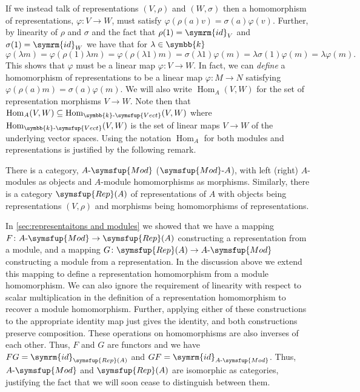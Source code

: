\documentclass[fleqn]{NotesClass}
\makeatletter
\renewcommand{\field}{\symbb{k}}
\newcommand{\id}{\symrm{id}}
\DeclareMathOperator{\Hom}{Hom}
\newcommand{\c@egory}[1]{\symsfup{#1}}
\newcommand{\Vect}[1][\field]{#1\text{-}\c@egory{Vect}}
\newcommand{\AMod}[1][A]{#1\text{-}\c@egory{Mod}}
\newcommand{\ModA}[1][A]{\c@egory{Mod}\text{-}#1}
\newcommand{\Rep}{\c@egory{Rep}}
\makeatother
\begin{document}
    If we instead talk of representations \((V, \rho)\) and \((W, \sigma)\) then a homomorphism of representations, \(\varphi \colon V \to W\), must satisfy \(\varphi(\rho(a)v) = \sigma(a)\varphi(v)\).
    Further, by linearity of \(\rho\) and \(\sigma\) and the fact that \(\rho(1) = \id_V\) and \(\sigma(1) = \id_W\) we have that for \(\lambda \in \field\)
    \begin{equation}
        \varphi(\lambda m) = \varphi(\rho(1)\lambda m) = \varphi(\rho(\lambda 1) m) = \sigma(\lambda 1)\varphi(m) = \lambda \sigma(1) \varphi(m) = \lambda \varphi(m).
    \end{equation}
    This shows that \(\varphi\) must be a linear map \(\varphi \colon V \to W\).
    In fact, we can \emph{define} a homomorphism of representations to be a linear map \(\varphi \colon M \to N\) satisfying \(\varphi(\rho(a)m) = \sigma(a)\varphi(m)\).
    We will also write \(\Hom_A(V, W)\) for the set of representation morphisms \(V \to W\).
    Note then that \(\Hom_A(V, W) \subseteq \Hom_{\Vect[\field]}(V, W)\) where \(\Hom_{\Vect[\field]}(V, W)\) is the set of linear maps \(V \to W\) of the underlying vector spaces.
    Using the notation \(\Hom_A\) for both modules and representations is justified by the following remark.
    
    \begin{remark}{}{}
        There is a category, \(\AMod\) (\(\ModA\)), with left (right) \(A\)-modules as objects and \(A\)-module homomorphisms as morphisms.
        Similarly, there is a category \(\Rep(A)\) of representations of \(A\) with objects being representations \((V, \rho)\) and morphisms being homomorphisms of representations.
        
        In \cref{sec:representaitons and modules} we showed that we have a mapping \(F \colon \AMod \to \Rep(A)\) constructing a representation from a module, and a mapping \(G \colon \Rep(A) \to \AMod\) constructing a module from a representation.
        In the discussion above we extend this mapping to define a representation homomorphism from a module homomorphism.
        We can also ignore the requirement of linearity with respect to scalar multiplication in the definition of a representation homomorphism to recover a module homomorphism.
        Further, applying either of these constructions to the appropriate identity map just gives the identity, and both constructions preserve composition.
        These operations on homomorphisms are also inverses of each other.
        Thus, \(F\) and \(G\) are functors and we have \(FG = \id_{\Rep(A)}\) and \(GF = \id_{\AMod}\).
        Thus, \(\AMod\) and \(\Rep(A)\) are isomorphic as categories, justifying the fact that we will soon cease to distinguish between them.
    \end{remark}
    
\end{document}
